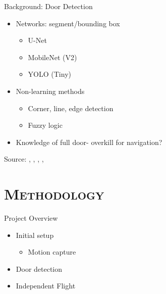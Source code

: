 \documentclass[xcolor=x11names,compress]{beamer}
\begin{document}
\begin{frame}{Background: Door Detection}
	\begin{itemize}
		\item Networks: segment/bounding box
		\begin{itemize}
            \item U-Net
            \item MobileNet (V2)
            \item YOLO (Tiny)
		\end{itemize}
		\item Non-learning methods
		\begin{itemize}
            \item Corner, line, edge detection
            \item Fuzzy logic
		\end{itemize}
		\item Knowledge of full door- overkill for navigation?
	\end{itemize}
    \tiny{Source: \cite{parallelogram}, \cite{Unet}, \cite{howard2017mobilenets}, \cite{Fuzzy}, \cite{yolov3} }
\end{frame}


\section{\scshape Methodology}



\begin{frame}{Project Overview}
	\vspace{-10pt}
	\begin{itemize}
		\item Initial setup
		\begin{itemize}
			\item Motion capture
		\end{itemize}
		\item Door detection
		\item Independent Flight
	\end{itemize}
\end{frame}
\end{document}
